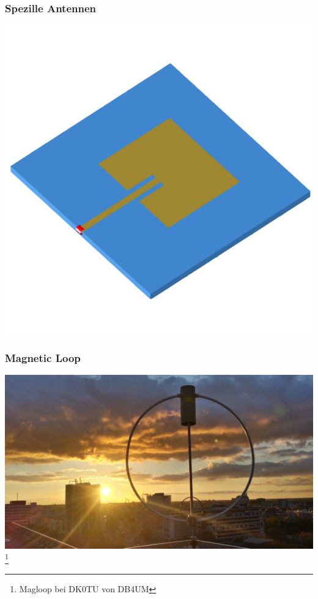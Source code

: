 \begin{frame}
  \frametitle{Spezille Antennen}
  \begin{center}
    \includegraphics[width=1\textwidth]{a09/patch.png}

  \end{center}
\end{frame}

\begin{frame}
  \frametitle{Magnetic Loop}
  \begin{center}
    \includegraphics[width=1\textwidth]{a09/Magloop.jpg}
    \footnote{\tiny Magloop bei DK0TU von DB4UM}
  \end{center}
\end{frame}

